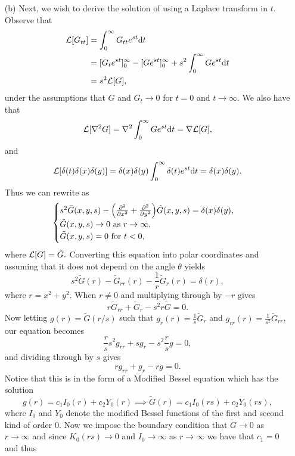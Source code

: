 \documentclass[12pt]{report}
\begin{document}
\begin{solution}
\begin{enumerate}
        \item [(b)]
        Next, we wish to derive the solution of  using a Laplace transform in $t$. Observe that
        \begin{align*}
            {\mathcal{L}}[G_{tt}] &= \int_0^\infty G_{tt}e^{st}{\mathrm{d}} t\\
            &= [G_te^{st}]_0^\infty - [Ge^{st}]_0^\infty + s^2 \int_0^\infty Ge^{st}{\mathrm{d}} t\\
            &=s^2 {\mathcal{L}}[G],
        \end{align*}
        under the assumptions that $G$ and $G_t \to 0$ for $t=0$ and $t\to\infty$. We also have that
        \[
            {\mathcal{L}}[\nabla^2G] = \nabla^2\int_0^\infty Ge^{st}{\mathrm{d}} t = \nabla {\mathcal{L}}[G],
        \]
        and
        \[
            {\mathcal{L}}[\delta(t)\delta(x)\delta(y)] = \delta(x)\delta(y)\int_0^\infty \delta(t) e^{st}{\mathrm{d}} t= \delta(x)\delta(y).
        \]
        Thus we can rewrite  as
        \[
            \begin{cases}
                s^2\tilde{G}(x,y,s) - {\left(\frac{\partial^{2} }{\partial x^{2}}+\frac{\partial^{2} }{\partial y^{2}}\right)}\tilde{G}(x,y,s) = \delta(x)\delta(y),\\
                \tilde{G}(x,y,s) \to 0 ~\text{as}~r\to\infty,\\
                \tilde{G}(x,y,s) = 0 ~\text{for}~t<0,
            \end{cases}
        \]
        where ${\mathcal{L}}[G] = \tilde{G}.$ Converting this equation into polar coordinates and assuming that it does not depend on the angle $\theta$ yields
        \[
            s^2\tilde{G}(r) - \tilde{G}_{rr}(r) - \frac{1}{r}\tilde{G}_r(r) = \delta(r),
        \]
        where $r=x^2 + y^2$. When $r \neq 0$ and multiplying through by $-r$ gives
        \[
            r\tilde{G}_{rr} + \tilde{G}_r - s^2r\tilde{G} = 0.
        \]
        Now letting $g(r) = \tilde{G}(r/s)$ such that $g_r(r) = \frac{1}{s}\tilde{G}_r$ and $g_{rr}(r) = \frac{1}{s^2}\tilde{G}_{rr}$, our equation becomes
        \[
            \frac{r}{s}s^2g_{rr} + sg_r - s^2 \frac{r}{s}g = 0,
        \]
        and dividing through by $s$ gives
        \[
            rg_{rr} + g_r - rg = 0.
        \]
        Notice that this is in the form of a Modified Bessel equation which has the solution
        \[
            g(r) = c_1I_0(r) + c_2Y_0(r) \implies \tilde{G}(r) = c_1I_0(rs) + c_2Y_0(rs),
        \]
        where $I_0$ and $Y_0$ denote the modified Bessel functions of the first and second kind of order $0$. Now we impose the boundary condition that $\tilde{G} \to 0$ as $r \to \infty$ and since $K_0(rs) \to 0$ and $I_0 \to \infty$ as $r \to \infty$ we have that $c_1 =0$ and thus

\end{enumerate}
\end{solution}
\end{document}
